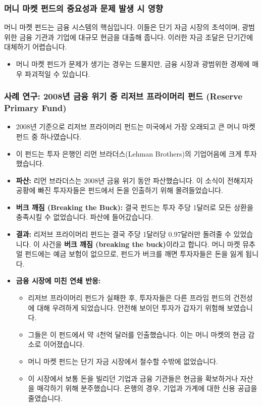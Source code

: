 \documentclass[11pt,a4paper]{article}
\begin{document}
\subsubsection*{머니 마켓 펀드의 중요성과 문제 발생 시 영향}
머니 마켓 펀드는 금융 시스템의 핵심입니다. 이들은 단기 자금 시장의 초석이며, 광범위한 금융 기관과 기업에 대규모 현금을 대출해 줍니다. 이러한 자금 조달은 단기간에 대체하기 어렵습니다.

\begin{itemize}
    \item 머니 마켓 펀드가 문제가 생기는 경우는 드물지만, 금융 시장과 광범위한 경제에 매우 파괴적일 수 있습니다.
\end{itemize}

\subsubsection*{사례 연구: 2008년 금융 위기 중 리저브 프라이머리 펀드 (Reserve Primary Fund)}
\begin{itemize}
    \item 2008년 기준으로 리저브 프라이머리 펀드는 미국에서 가장 오래되고 큰 머니 마켓 펀드 중 하나였습니다.
    \item 이 펀드는 투자 은행인 리먼 브라더스(Lehman Brothers)의 기업어음에 크게 투자했습니다.
    \item \textbf{파산:} 리먼 브라더스는 2008년 금융 위기 동안 파산했습니다. 이 소식이 전해지자 공황에 빠진 투자자들은 펀드에서 돈을 인출하기 위해 몰려들었습니다.
    \item \textbf{버크 깨짐 (Breaking the Buck):} 결국 펀드는 투자 주당 1달러로 모든 상환을 충족시킬 수 없었습니다. 파산에 들어갔습니다.
    \item \textbf{결과:} 리저브 프라이머리 펀드는 결국 주당 1달러당 0.97달러만 돌려줄 수 있었습니다. 이 사건을 \textbf{버크 깨짐 (breaking the buck)}이라고 합니다. 머니 마켓 뮤추얼 펀드에는 예금 보험이 없으므로, 펀드가 버크를 깨면 투자자들은 돈을 잃게 됩니다.
    \item \textbf{금융 시장에 미친 연쇄 반응:}
    \begin{itemize}
        \item 리저브 프라이머리 펀드가 실패한 후, 투자자들은 다른 프라임 펀드의 건전성에 대해 우려하게 되었습니다. 안전해 보이던 투자가 갑자기 위험해 보였습니다.
        \item 그들은 이 펀드에서 약 4천억 달러를 인출했습니다. 이는 머니 마켓의 현금 감소로 이어졌습니다.
        \item 머니 마켓 펀드는 단기 자금 시장에서 철수할 수밖에 없었습니다.
        \item 이 시장에서 보통 돈을 빌리던 기업과 금융 기관들은 현금을 확보하거나 자산을 매각하기 위해 분주했습니다. 은행의 경우, 기업과 가계에 대한 신용 공급을 줄였습니다.
    \end{itemize}
\end{itemize}
\end{document}
